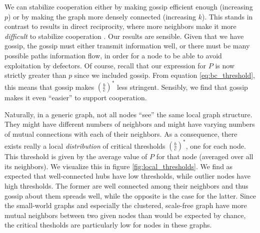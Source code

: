 \documentclass{article}
\renewcommand{\=}[1]{\stackrel{#1}{=}} %
\begin{document}
We can stabilize cooperation either by making gossip efficient enough (increasing $p$) or by making the graph more densely connected (increasing $k$). This stands in contrast to results in direct reciprocity, where more neighbors make it more \emph{difficult} to stabilize cooperation \cite{ohtsuki2006simple}. Our results are sensible. Given that we have gossip, the gossip must either transmit information well, or there must be many possible paths information flow, in order for a node to be able to avoid exploitation by defectors. Of course, recall that our expression for $P$ is now strictly greater than $p$ since we included gossip. From equation \ref{eq:bc_threshold}, this means that gossip makes $\left( \frac{b}{c}\right)^*$ less stringent. Sensibly, we find that gossip makes it even ``easier'' to support cooperation. 

Naturally, in a generic graph, not all nodes ``see'' the same local graph structure. They might have different numbers of neighbors and might have varying numbers of mutual connections with each of their neighbors. As a consequence, there exists really a local \emph{distribution} of critical thresholds $\left( \frac{b}{c} \right)^*$, one for each node. This threshold is given by the average value of $P$ for that node (averaged over all its neighbors). We visualize this in figure \ref{fig:local_thresholds}. We find as expected that well-connected hubs have low thresholds, while outlier nodes have high thresholds. The former are well connected among their neighbors and thus gossip about them spreads well, while the opposite is the case for the latter. Since the small-world graphs and especially the clustered, scale-free graph have more mutual neighbors between two given nodes than would be expected by chance, the critical thesholds are particularly low for nodes in these graphs.
\end{document}
